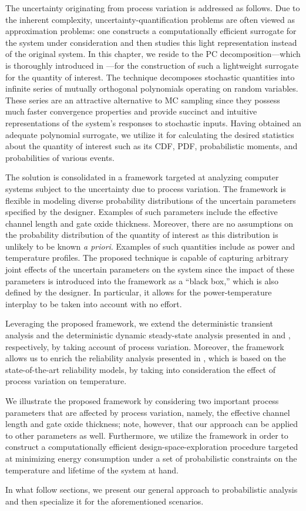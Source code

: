 The uncertainty originating from process variation is addressed as follows. Due
to the inherent complexity, uncertainty-quantification problems are often viewed
as approximation problems: one constructs a computationally efficient surrogate
for the system under consideration and then studies this light representation
instead of the original system. In this chapter, we reside to the \ac{PC}
decomposition---which is thoroughly introduced in ---for
the construction of such a lightweight surrogate for the quantity of interest.
The technique decomposes stochastic quantities into infinite series of mutually
orthogonal polynomials operating on random variables. These series are an
attractive alternative to \ac{MC} sampling since they possess much faster
convergence properties and provide succinct and intuitive representations of the
system's responses to stochastic inputs. Having obtained an adequate polynomial
surrogate, we utilize it for calculating the desired statistics about the
quantity of interest such as its \ac{CDF}, \ac{PDF}, probabilistic moments, and
probabilities of various events.

The solution is consolidated in a framework targeted at analyzing computer
systems subject to the uncertainty due to process variation. The framework is
flexible in modeling diverse probability distributions of the uncertain
parameters specified by the designer. Examples of such parameters include the
effective channel length and gate oxide thickness. Moreover, there are no
assumptions on the probability distribution of the quantity of interest as this
distribution is unlikely to be known \emph{a priori}. Examples of such
quantities include as power and temperature profiles. The proposed technique is
capable of capturing arbitrary joint effects of the uncertain parameters on the
system since the impact of these parameters is introduced into the framework as
a ``black box,'' which is also defined by the designer. In particular, it allows
for the power-temperature interplay to be taken into account with no effort.

Leveraging the proposed framework, we extend the deterministic transient
analysis and the deterministic dynamic steady-state analysis presented in
 and ,
respectively, by taking account of process variation. Moreover, the framework
allows us to enrich the reliability analysis presented in
, which is based on the state-of-the-art reliability
models, by taking into consideration the effect of process variation on
temperature.

We illustrate the proposed framework by considering two important process
parameters that are affected by process variation, namely, the effective channel
length and gate oxide thickness; note, however, that our approach can be applied
to other parameters as well. Furthermore, we utilize the framework in order to
construct a computationally efficient design-space-exploration procedure
targeted at minimizing energy consumption under a set of probabilistic
constraints on the temperature and lifetime of the system at hand.

In what follow sections, we present our general approach to probabilistic
analysis and then specialize it for the aforementioned scenarios.
